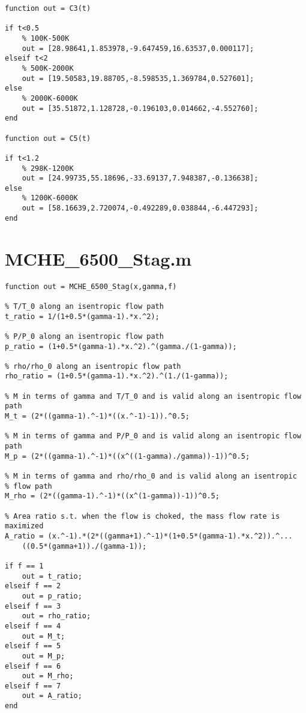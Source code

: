 \documentclass{article}
\begin{document}
\begin{lstlisting}[style=Matlab-editor]
function out = C3(t)

if t<0.5
    % 100K-500K
    out = [28.98641,1.853978,-9.647459,16.63537,0.000117];
elseif t<2
    % 500K-2000K
    out = [19.50583,19.88705,-8.598535,1.369784,0.527601];
else
    % 2000K-6000K
    out = [35.51872,1.128728,-0.196103,0.014662,-4.552760];
end

function out = C5(t)

if t<1.2
    % 298K-1200K
    out = [24.99735,55.18696,-33.69137,7.948387,-0.136638];
else
    % 1200K-6000K
    out = [58.16639,2.720074,-0.492289,0.038844,-6.447293];
end
\end{lstlisting}

\section*{MCHE\_6500\_Stag.m}
\begin{lstlisting}[style=Matlab-editor]
function out = MCHE_6500_Stag(x,gamma,f)

% T/T_0 along an isentropic flow path 
t_ratio = 1/(1+0.5*(gamma-1).*x.^2);

% P/P_0 along an isentropic flow path
p_ratio = (1+0.5*(gamma-1).*x.^2).^(gamma./(1-gamma));

% rho/rho_0 along an isentropic flow path
rho_ratio = (1+0.5*(gamma-1).*x.^2).^(1./(1-gamma));

% M in terms of gamma and T/T_0 and is valid along an isentropic flow path
M_t = (2*((gamma-1).^-1)*((x.^-1)-1)).^0.5;

% M in terms of gamma and P/P_0 and is valid along an isentropic flow path
M_p = (2*((gamma-1).^-1)*((x^((1-gamma)./gamma))-1))^0.5;

% M in terms of gamma and rho/rho_0 and is valid along an isentropic 
% flow path
M_rho = (2*((gamma-1).^-1)*((x^(1-gamma))-1))^0.5;

% Area ratio s.t. when the flow is choked, the mass flow rate is maximized
A_ratio = (x.^-1).*(2*((gamma+1).^-1)*(1+0.5*(gamma-1).*x.^2)).^...
    ((0.5*(gamma+1))./(gamma-1));

if f == 1
    out = t_ratio;
elseif f == 2
    out = p_ratio;
elseif f == 3
    out = rho_ratio;
elseif f == 4
    out = M_t;
elseif f == 5
    out = M_p;
elseif f == 6
    out = M_rho;
elseif f == 7
    out = A_ratio;
end
\end{lstlisting}

\newpage
\end{document}
